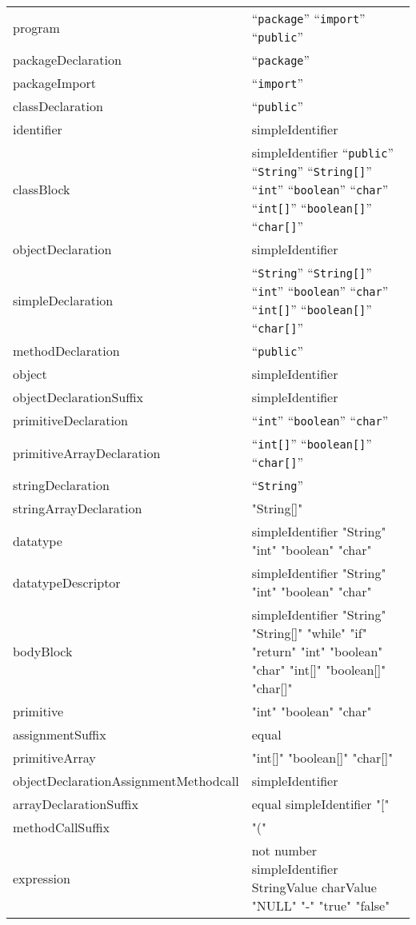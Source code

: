 \begin{tabularx}{\linewidth}{YY}
program & ``\texttt{package}'' ``\texttt{import}'' ``\texttt{public}'' \\
packageDeclaration & ``\texttt{package}'' \\
packageImport & ``\texttt{import}'' \\
classDeclaration & ``\texttt{public}'' \\
identifier & simpleIdentifier \\
classBlock & simpleIdentifier ``\texttt{public}'' ``\texttt{String}'' ``\texttt{String[]}'' ``\texttt{int}'' ``\texttt{boolean}'' ``\texttt{char}'' ``\texttt{int[]}'' ``\texttt{boolean[]}'' ``\texttt{char[]}'' \\
objectDeclaration & simpleIdentifier \\
simpleDeclaration & ``\texttt{String}'' ``\texttt{String[]}'' ``\texttt{int}'' ``\texttt{boolean}'' ``\texttt{char}'' ``\texttt{int[]}'' ``\texttt{boolean[]}'' ``\texttt{char[]}'' \\
methodDeclaration & ``\texttt{public}'' \\
object & simpleIdentifier \\
objectDeclarationSuffix & simpleIdentifier \\
primitiveDeclaration & ``\texttt{int}'' ``\texttt{boolean}'' ``\texttt{char}'' \\
primitiveArrayDeclaration & ``\texttt{int[]}'' ``\texttt{boolean[]}'' ``\texttt{char[]}'' \\
stringDeclaration & ``\texttt{String}'' \\
stringArrayDeclaration & "String[]" \\
datatype & simpleIdentifier "String" "int" "boolean" "char" \\
datatypeDescriptor & simpleIdentifier "String" "int" "boolean" "char" \\
bodyBlock & simpleIdentifier "String" "String[]" "while" "if" "return" "int" "boolean" "char" "int[]" "boolean[]" "char[]" \\
primitive & "int" "boolean" "char" \\
assignmentSuffix & equal \\
primitiveArray & "int[]" "boolean[]" "char[]" \\
objectDeclarationAssignmentMethodcall & simpleIdentifier \\
arrayDeclarationSuffix & equal simpleIdentifier "[" \\
methodCallSuffix & "(" \\
expression & not number simpleIdentifier StringValue charValue "NULL" "-" "true" "false" \\

\end{tabularx}
